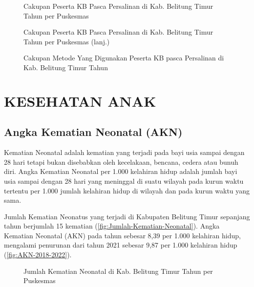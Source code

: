 \begin{figure}[H]
    \centering
    \caption{Cakupan Peserta KB Pasca Persalinan di Kab. Belitung Timur Tahun \tP per Puskesmas}
    \label{fig:Cakupan-KB-pascaSalin-a}
\end{figure}

\begin{figure}[H]
    \centering
    \caption{Cakupan Peserta KB Pasca Persalinan di Kab. Belitung Timur Tahun \tP per Puskesmas (lanj.)}
    \label{fig:Cakupan-KB-pascaSalin-b}
\end{figure}

\begin{figure}[H]
    \centering
    \caption{Cakupan Metode Yang Digunakan Peserta KB pasca Persalinan di Kab. Belitung Timur Tahun \tP}
    \label{fig:Cakupan-KB-pascaSalin-c}
\end{figure}

\section{KESEHATAN ANAK}
\subsection{Angka Kematian Neonatal (AKN)}
Kematian Neonatal adalah kematian yang terjadi pada bayi usia sampai dengan 28 hari tetapi bukan disebabkan oleh kecelakaan, bencana, cedera atau bunuh diri. Angka Kematian Neonatal per 1.000 kelahiran hidup adalah jumlah bayi usia sampai dengan 28 hari yang meninggal di suatu wilayah pada kurun waktu tertentu per 1.000 jumlah kelahiran hidup di wilayah dan pada kurun waktu yang sama.

Jumlah Kematian Neonatus yang terjadi di Kabupaten Belitung Timur sepanjang tahun \tP berjumlah 15 kematian (\autoref{fig:Jumlah-Kematian-Neonatal}). Angka Kematian Neonatal (AKN) pada tahun \tP sebesar 8,39 per 1.000 kelahiran hidup, mengalami penurunan dari tahun 2021 sebesar 9,87 per 1.000 kelahiran hidup (\autoref{fig:AKN-2018-2022}).

\begin{figure}[H]
    \centering{}
    \caption{Jumlah Kematian Neonatal di Kab. Belitung Timur Tahun \tP per Puskesmas}
    \label{fig:Jumlah-Kematian-Neonatal}
\end{figure}

